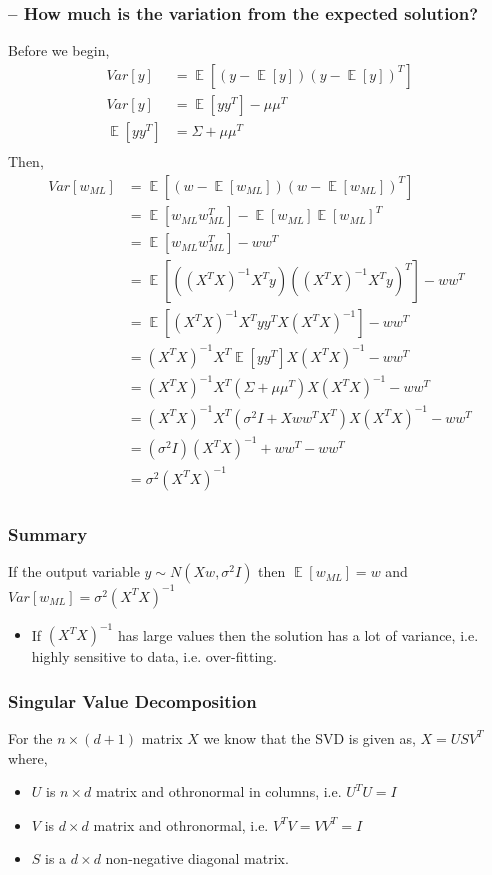 \documentclass{article}
\DeclareMathOperator*{\E}{\mathop{\mathbb{E}}}
\begin{document}
\subsubsection{-- How much is the variation from the expected solution?}
Before we begin,
\begin{align*}
    Var[y] &= \E[(y-\E[y])(y-\E[y])^T]\\
    Var[y] & = \E[yy^T]-\mu\mu^T\\
    \E[yy^T] &= \Sigma + \mu\mu^T\\
\end{align*}
Then,
\begin{align*}
    Var[w_{ML}] &= \E[(w-\E[w_{ML}])(w-\E[w_{ML}])^T]\\
    & = \E[w_{ML}w_{ML}^T]-\E[w_{ML}]\E[w_{ML}]^T\\
    & = \E[w_{ML}w_{ML}^T]-ww^T\\
    & = \E[ ((X^TX)^{-1}X^Ty) ((X^TX)^{-1}X^Ty)^T]-ww^T\\
    & = \E[(X^TX)^{-1}X^Tyy^TX(X^TX)^{-1}]-ww^T\\
    & = (X^TX)^{-1}X^T \E[yy^T] X(X^TX)^{-1} - ww^T\\
    & = (X^TX)^{-1}X^T (\Sigma + \mu\mu^T)  X(X^TX)^{-1} - ww^T\\
    & = (X^TX)^{-1}X^T (\sigma^2I + Xww^TX^T)  X(X^TX)^{-1} - ww^T\\ 
    & = (\sigma^2I)(X^TX)^{-1} + ww^T - ww^T\\
    & = \sigma^2(X^TX)^{-1}\\
\end{align*}

\subsubsection{Summary}
If the output variable $y \sim N(Xw, \sigma^2I)$ then $\E[w_{ML}]=w$ and $Var[w_{ML}]=\sigma^2(X^TX)^{-1}$

\begin{itemize}
    \item If $(X^TX)^{-1}$ has large values then the solution has a lot of variance, i.e. highly sensitive to data, i.e. over-fitting.
\end{itemize}

\subsubsection{Singular Value Decomposition}
For the $n \times (d+1)$ matrix $X$ we know that the SVD is given as, $X=USV^T$ where,
\begin{itemize}
    \item $U$ is $n \times d$ matrix and othronormal in columns, i.e. $U^TU=I$
    \item $V$ is $d \times d$ matrix and othronormal, i.e. $V^TV=VV^T=I$
    \item $S$ is a $d\times d$ non-negative diagonal matrix.
\end{itemize}
\end{document}

